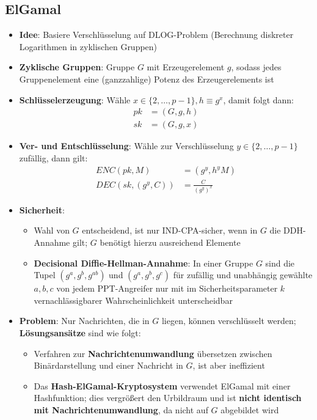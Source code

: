 \subsection{ElGamal}%
\label{asver:sub:elgamal}

\begin{itemize}
	\item \textbf{Idee}: Basiere Verschlüsselung auf DLOG-Problem (Berechnung diskreter Logarithmen in zyklischen Gruppen)
	\item \textbf{Zyklische Gruppen}: Gruppe $G$ mit Erzeugerelement $g$, sodass jedes Gruppenelement eine (ganzzahlige) Potenz des Erzeugerelements ist
	\item \textbf{Schlüsselerzeugung}: Wähle $x \in \{2, \dots, p - 1\}, h \equiv g^x$, damit folgt dann:
	\begin{align*}
		pk &= (G, g, h)\\
		sk &= (G, g, x)
	\end{align*}
	\item \textbf{Ver- und Entschlüsselung}: Wähle zur Verschlüsselung $y \in \{2, \dots, p - 1\}$ zufällig, dann gilt:
	\begin{align*}
		ENC(pk, M) &= (g^y, h^yM)\\
		DEC(sk, (g^y, C)) &= \frac{C}{(g^y)^x}
	\end{align*}
	\item \textbf{Sicherheit}:
	\begin{itemize}
		\item Wahl von $G$ entscheidend, ist nur IND-CPA-sicher, wenn in $G$ die DDH-Annahme gilt; $G$ benötigt hierzu ausreichend Elemente
		\item \textbf{Decisional Diffie-Hellman-Annahme}: In einer Gruppe $G$ sind die Tupel $(g^a, g^b, g^{ab})$ und $(g^a, g^b, g^c)$ für zufällig und unabhängig gewählte $a, b, c$ von jedem PPT-Angreifer nur mit im Sicherheitsparameter $k$ vernachlässigbarer Wahrscheinlichkeit unterscheidbar
	\end{itemize}
	\item \textbf{Problem}: Nur Nachrichten, die in $G$ liegen, können verschlüsselt werden; \textbf{Lösungsansätze} sind wie folgt:
	\begin{itemize}
		\item Verfahren zur \textbf{Nachrichtenumwandlung} übersetzen zwischen Binärdarstellung und einer Nachricht in $G$, ist aber ineffizient
		\item Das \textbf{Hash-ElGamal-Kryptosystem} verwendet ElGamal mit einer Hashfunktion; dies vergrößert den Urbildraum und ist \textbf{nicht identisch mit Nachrichtenumwandlung}, da nicht auf $G$ abgebildet wird
	\end{itemize}
\end{itemize}